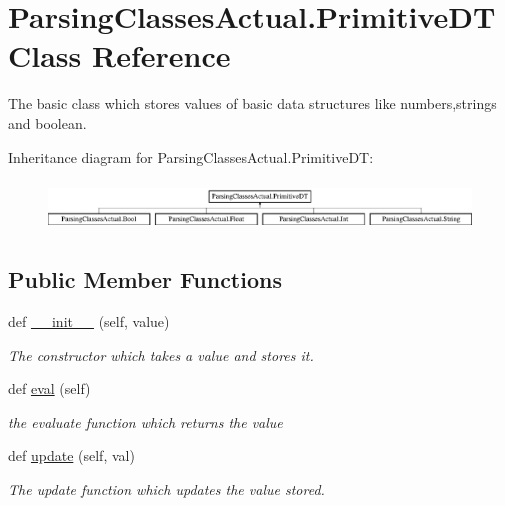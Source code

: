 \hypertarget{class_parsing_classes_actual_1_1_primitive_d_t}{}\section{Parsing\+Classes\+Actual.\+Primitive\+DT Class Reference}
\label{class_parsing_classes_actual_1_1_primitive_d_t}


The basic class which stores values of basic data structures like numbers,strings and boolean.  


Inheritance diagram for Parsing\+Classes\+Actual.\+Primitive\+DT\+:\begin{figure}[H]
\begin{center}
\leavevmode
\includegraphics[height=1.327014cm]{class_parsing_classes_actual_1_1_primitive_d_t}
\end{center}
\end{figure}
\subsection*{Public Member Functions}
\begin{DoxyCompactItemize}
\item 
\mbox{\label{class_parsing_classes_actual_1_1_primitive_d_t_a2304320d29f6a8dc8ae980daf77f2f05}} 
def \hyperlink{class_parsing_classes_actual_1_1_primitive_d_t_a2304320d29f6a8dc8ae980daf77f2f05}{\+\_\+\+\_\+init\+\_\+\+\_\+} (self, value)
\begin{DoxyCompactList}\small\item\em The constructor which takes a value and stores it. \end{DoxyCompactList}\item 
\mbox{\label{class_parsing_classes_actual_1_1_primitive_d_t_a39857bf656def22c6270a26804e1d7aa}} 
def \hyperlink{class_parsing_classes_actual_1_1_primitive_d_t_a39857bf656def22c6270a26804e1d7aa}{eval} (self)
\begin{DoxyCompactList}\small\item\em the evaluate function which returns the value \end{DoxyCompactList}\item 
def \hyperlink{class_parsing_classes_actual_1_1_primitive_d_t_ac6dd10edd29b85354b53ad165f5704d1}{update} (self, val)
\begin{DoxyCompactList}\small\item\em The update function which updates the value stored. \end{DoxyCompactList}\end{DoxyCompactItemize}

